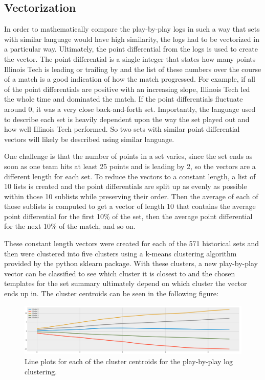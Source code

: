 \documentclass{article}
\begin{document}
\subsection{Vectorization}
In order to mathematically compare the play-by-play logs in such a way that sets with similar language would have high similarity, the logs had to be vectorized in a particular way. Ultimately, the point differential from the logs is used to create the vector. The point differential is a single integer that states how many points Illinois Tech is leading or trailing by and the list of these numbers over the course of a match is a good indication of how the match progressed. For example, if all of the point differentials are positive with an increasing slope, Illinois Tech led the whole time and dominated the match. If the point differentials fluctuate around 0, it was a very close back-and-forth set. Importantly, the language used to describe each set is heavily dependent upon the way the set played out and how well Illinois Tech performed. So two sets with similar point differential vectors will likely be described using similar language. 

One challenge is that the number of points in a set varies, since the set ends as soon as one team hits at least 25 points and is leading by 2, so the vectors are a different length for each set. To reduce the vectors to a constant length, a list of 10 lists is created and the point differentials are split up as evenly as possible within those 10 sublists while preserving their order. Then the average of each of those sublists is computed to get a vector of length 10 that contains the average point differential for the first 10\% of the set, then the average point differential for the next 10\% of the match, and so on. 

These constant length vectors were created for each of the 571 historical sets and then were clustered into five clusters using a k-means clustering algorithm provided by the python sklearn package. With these clusters, a new play-by-play vector can be classified to see which cluster it is closest to and the chosen templates for the set summary ultimately depend on which cluster the vector ends up in. The cluster centroids can be seen in the following figure:
\begin{figure}[ht]
\begin{center}
\centerline{\includegraphics[width=\columnwidth]{clusters}}
\caption{Line plots for each of the cluster centroids for the play-by-play log clustering.}
\label{clusters}
\end{center}
\end{figure} 
\end{document}
